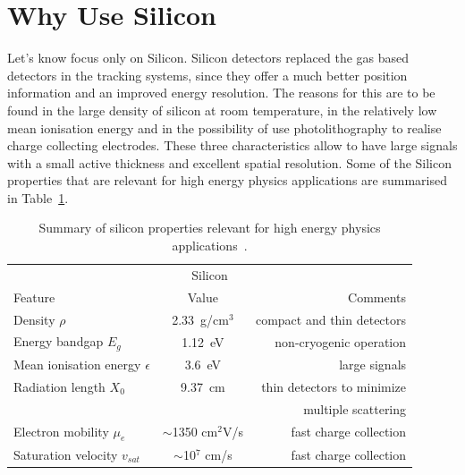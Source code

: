 \section{Why Use Silicon}
\label{sec:Silicon}
Let's know focus only on Silicon. Silicon detectors replaced the  gas based detectors in the tracking systems, since they offer a much
 better position information and an improved energy resolution. The reasons for this are to be found 
in the large density of silicon at room temperature, in the relatively low mean ionisation energy and 
in the possibility of use photolithography to realise charge collecting electrodes. 
These three characteristics allow to have large signals with a small active thickness and 
excellent spatial resolution. Some of the Silicon properties that are relevant for high energy 
physics applications are summarised in Table~\ref{tab:SiProperties}.


\begin{table}[htbp]
   \centering
   \begin{tabular}{@{} lcr @{}} %
      \toprule
      \multicolumn{3}{c}{Silicon} \\
      \cmidrule(r){1-3} %
      Feature    & Value & Comments \\
      \midrule
      Density  $\rho$    & 2.33~g/cm${^3}$ & compact and thin detectors  \\
      Energy bandgap $E_g$ & 1.12~eV & non-cryogenic operation \\
      Mean ionisation energy $\epsilon$ & 3.6~eV & large signals\\
      Radiation length $X_0$      &  9.37~cm & thin detectors to minimize  \\
                                       &                 & multiple scattering \\
      Electron mobility  $\mu_e$     & $\sim$1350 cm$^2$V/s  & fast charge collection \\
      Saturation velocity $v_{sat}$ & $\sim$10$^{7}$ cm/s & fast charge collection \\
      \bottomrule
   \end{tabular}
   \caption{Summary of silicon properties relevant for high energy physics applications~\cite{Lutz:411172}.}
   \label{tab:SiProperties}
\end{table}

